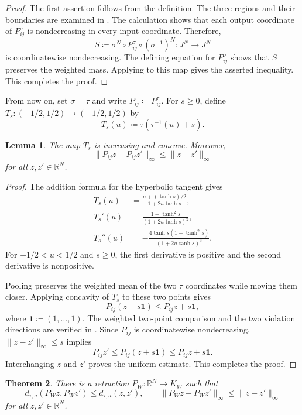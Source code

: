 \documentclass[11pt]{amsart}
\theoremstyle{plain}
\newtheorem{theorem}{Theorem}[section]
\newtheorem{lemma}[theorem]{Lemma}
\theoremstyle{definition}
\theoremstyle{remark}
\newcommand{\R}{\mathbb R}
\begin{document}
\begin{proof}
The first assertion follows from the definition. The three regions and their boundaries are examined in . The calculation shows that each output coordinate of $P_{ij}^\sigma$ is nondecreasing in every input coordinate. Therefore,
\[
S\coloneqq\sigma^N\circ P_{ij}^\sigma\circ(\sigma^{-1})^N\colon J^N\longrightarrow J^N
\]
is coordinatewise nondecreasing. The defining equation for $P_{ij}^\sigma$ shows that $S$ preserves the weighted mass. Applying  to this map gives the asserted inequality. This completes the proof.
\end{proof}

From now on, set $\sigma=\tau$ and write $P_{ij}\coloneqq P_{ij}^\tau$. For $s\geq0$, define $T_s\colon(-1/2,1/2)\to(-1/2,1/2)$ by
\[
T_s(u)\coloneqq\tau(\tau^{-1}(u)+s).
\]

\begin{lemma}
\label{lem:tau-concavity}
The map $T_s$ is increasing and concave. Moreover,
\[
\|P_{ij}z-P_{ij}z'\|_\infty\leq\|z-z'\|_\infty
\]
for all $z,z'\in\R^N$.
\end{lemma}

\begin{proof}
The addition formula for the hyperbolic tangent gives
\[
\begin{aligned}
T_s(u)&=\frac{u+(\tanh s)/2}{1+2u\tanh s},\\
T_s'(u)&=\frac{1-\tanh^2s}{(1+2u\tanh s)^2},\\
T_s''(u)&=-\frac{4\tanh s(1-\tanh^2s)}{(1+2u\tanh s)^3}.
\end{aligned}
\]
For $-1/2<u<1/2$ and $s\geq0$, the first derivative is positive and the second derivative is nonpositive.

Pooling preserves the weighted mean of the two $\tau$ coordinates while moving them closer. Applying concavity of $T_s$ to these two points gives
\[
P_{ij}(z+s\boldsymbol1)\leq P_{ij}z+s\boldsymbol1,
\]
where $\boldsymbol1\coloneqq(1,\ldots,1)$. The weighted two-point comparison and the two violation directions are verified in . Since $P_{ij}$ is coordinatewise nondecreasing, $\|z-z'\|_\infty\leq s$ implies
\[
P_{ij}z'\leq P_{ij}(z+s\boldsymbol1)\leq P_{ij}z+s\boldsymbol1.
\]
Interchanging $z$ and $z'$ proves the uniform estimate. This completes the proof.
\end{proof}

\begin{theorem}
\label{thm:pooling-retraction}
There is a retraction $P_W\colon\R^N\to K_W$ such that
\[
d_{\tau,a}(P_Wz,P_Wz')\leq d_{\tau,a}(z,z'),\qquad\|P_Wz-P_Wz'\|_\infty\leq\|z-z'\|_\infty
\]
for all $z,z'\in\R^N$.
\end{theorem}
\end{document}
